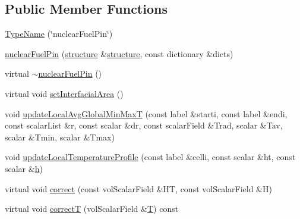 \subsection*{Public Member Functions}
\begin{DoxyCompactItemize}
\item 
\hyperlink{classFoam_1_1powerModels_1_1nuclearFuelPin_aa9b60de7cb506f0fa9f113d83b57eb95}{Type\+Name} (\char`\"{}nuclear\+Fuel\+Pin\char`\"{})
\item 
\hyperlink{classFoam_1_1powerModels_1_1nuclearFuelPin_a00a0807b8131c3860dc8ac801e00dc68}{nuclear\+Fuel\+Pin} (\hyperlink{classFoam_1_1structure}{structure} \&\hyperlink{classFoam_1_1structure}{structure}, const dictionary \&dicts)
\item 
virtual \hyperlink{classFoam_1_1powerModels_1_1nuclearFuelPin_a19e056f77dfc563497575fbc7609cf88}{$\sim$nuclear\+Fuel\+Pin} ()
\item 
virtual void \hyperlink{classFoam_1_1powerModels_1_1nuclearFuelPin_a8fc8c05c610e629783c80688340f8db4}{set\+Interfacial\+Area} ()
\item 
void \hyperlink{classFoam_1_1powerModels_1_1nuclearFuelPin_a156a2a794e9317591692be62c0a33299}{update\+Local\+Avg\+Global\+Min\+MaxT} (const label \&starti, const label \&endi, const scalar\+List \&r, const scalar \&dr, const scalar\+Field \&Trad, scalar \&Tav, scalar \&Tmin, scalar \&Tmax)
\item 
void \hyperlink{classFoam_1_1powerModels_1_1nuclearFuelPin_aebceb9d61655d7851a7ab3a7710164ea}{update\+Local\+Temperature\+Profile} (const label \&celli, const scalar \&ht, const scalar \&\hyperlink{createFieldRefs_8H_a52f2dcc529f3c146980b0ce8dc591698}{h})
\item 
virtual void \hyperlink{classFoam_1_1powerModels_1_1nuclearFuelPin_a08cf6ccfed7f616074be223f0d2379f3}{correct} (const vol\+Scalar\+Field \&HT, const vol\+Scalar\+Field \&H)
\item 
virtual void \hyperlink{classFoam_1_1powerModels_1_1nuclearFuelPin_a9f9875fb3a22007b3cb6ef9f59821c9c}{correctT} (vol\+Scalar\+Field \&\hyperlink{EEqn__1pl_8H_ad0f94aa7ea43d4be0bae24e3a89aad0c}{T}) const
\end{DoxyCompactItemize}
